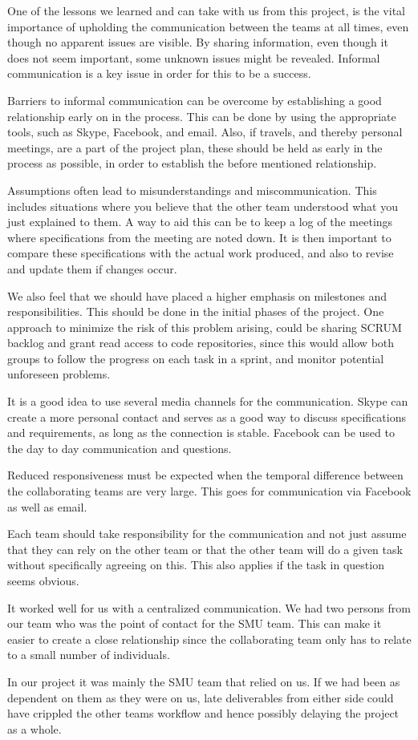 One of the lessons we learned and can take with us from this project, is the vital importance of upholding the communication between the teams at all times, even though no apparent issues are visible. By sharing information, even though it does not seem important, some unknown issues might be revealed. Informal communication is a key issue in order for this to be a success.

Barriers to informal communication can be overcome by establishing a good relationship early on in the process. This can be done by using the appropriate tools, such as Skype, Facebook, and email. Also, if travels, and thereby personal meetings, are a part of the project plan, these should be held as early in the process as possible, in order to establish the before mentioned relationship.

Assumptions often lead to misunderstandings and miscommunication. This includes situations where you believe that the other team understood what you just explained to them. A way to aid this can be to keep a log of the meetings where specifications from the meeting are noted down. It is then important to compare these specifications with the actual work produced, and also to revise and update them if changes occur.

We also feel that we should have placed a higher emphasis on milestones and responsibilities. This should be done in the initial phases of the project. One approach to minimize the risk of this problem arising, could be sharing SCRUM backlog and grant read access to code repositories, since this would allow both groups to follow the progress on each task in a sprint, and monitor potential unforeseen problems.

It is a good idea to use several media channels for the communication. Skype can create a more personal contact and serves as a good way to discuss specifications and requirements, as long as the connection is stable. Facebook can be used to the day to day communication and questions.

Reduced responsiveness must be expected when the temporal difference between the collaborating teams are very large. This goes for communication via Facebook as well as email.

Each team should take responsibility for the communication and not just assume that they can rely on the other team or that the other team will do a given task without specifically agreeing on this. This also applies if the task in question seems obvious.

It worked well for us with a centralized communication. We had two persons from our team who was the point of contact for the SMU team. This can make it easier to create a close relationship since the collaborating team only has to relate to a small number of individuals.

In our project it was mainly the SMU team that relied on us. If we had been as dependent on them as they were on us, late deliverables from either side could have crippled the other teams workflow and hence possibly delaying the project as a whole.
